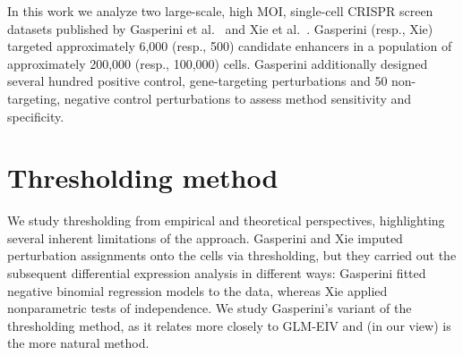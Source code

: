 \documentclass[12pt]{article}
\begin{document}
In this work we analyze two large-scale, high MOI, single-cell CRISPR screen datasets published by Gasperini et al.\ \cite{Gasperini2019} and Xie et al.\ \cite{Xie2019a}. Gasperini (resp., Xie) targeted approximately 6,000 (resp., 500) candidate enhancers in a population of approximately 200,000 (resp., 100,000) cells. Gasperini additionally designed several hundred positive control, gene-targeting perturbations and 50 non-targeting, negative control perturbations to assess method sensitivity and specificity.

\section{Thresholding method}
We study thresholding from empirical and theoretical perspectives, highlighting several inherent limitations of the approach. Gasperini and Xie imputed perturbation assignments onto the cells via thresholding, but they carried out the subsequent differential expression analysis in different ways: Gasperini fitted negative binomial regression models to the data, whereas Xie applied nonparametric tests of independence. We study Gasperini's variant of the thresholding method, as it relates more closely to GLM-EIV and (in our view) is the more natural method.
\end{document}
